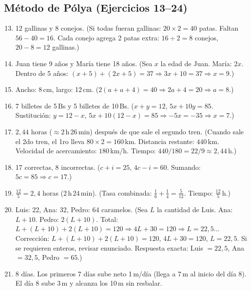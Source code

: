 \documentclass[12pt, letterpaper]{article}
\begin{document}
  \subsection*{Método de Pólya (Ejercicios 13--24)}

  \begin{enumerate}[leftmargin=*, label=\textbf{\arabic*.}]
    \setcounter{enumi}{12}
    \item 12 gallinas y 8 conejos. (Si todas fueran gallinas: $20 \times 2 = 40$ patas. Faltan $56 - 40 = 16$. Cada conejo agrega 2 patas extra: $16 \div 2 = 8$ conejos, $20 - 8 = 12$ gallinas.)

    \item Juan tiene 9 años y María tiene 18 años. (Sea $x$ la edad de Juan. María: $2x$. Dentro de 5 años: $(x + 5) + (2x + 5) = 37 \Rightarrow 3x + 10 = 37 \Rightarrow x = 9$.)

    \item Ancho: 8\,cm, largo: 12\,cm. ($2(a + a + 4) = 40 \Rightarrow 2a + 4 = 20 \Rightarrow a = 8$.)

    \item 7 billetes de 5\,Bs y 5 billetes de 10\,Bs. ($x + y = 12$, $5x + 10y = 85$. Sustitución: $y = 12 - x$, $5x + 10(12 - x) = 85 \Rightarrow -5x = -35 \Rightarrow x = 7$.)

    \item $2{,}44$ horas ($\approx 2$\,h\,26\,min) después de que sale el segundo tren. (Cuando sale el 2do tren, el 1ro lleva $80 \times 2 = 160$\,km. Distancia restante: $440$\,km. Velocidad de acercamiento: $180$\,km/h. Tiempo: $440/180 = 22/9 \approx 2{,}44$\,h.)

    \item 17 correctas, 8 incorrectas. ($c + i = 25$, $4c - i = 60$. Sumando: $5c = 85 \Rightarrow c = 17$.)

    \item $\frac{12}{5} = 2{,}4$ horas (2\,h\,24\,min). (Tasa combinada: $\frac{1}{6} + \frac{1}{4} = \frac{5}{12}$. Tiempo: $\frac{12}{5}$\,h.)

    \item Luis: 22, Ana: 32, Pedro: 64 caramelos. (Sea $L$ la cantidad de Luis. Ana: $L + 10$. Pedro: $2(L + 10)$. Total: $L + (L + 10) + 2(L + 10) = 120 \Rightarrow 4L + 30 = 120 \Rightarrow L = 22{,}5$... Corrección: $L + (L+10) + 2(L+10) = 120$, $4L + 30 = 120$, $L = 22{,}5$. Si se requieren enteros, revisar enunciado. Respuesta exacta: Luis $= 22{,}5$, Ana $= 32{,}5$, Pedro $= 65$.)

    \item 8 días. Los primeros 7 días sube neto 1\,m/día (llega a 7\,m al inicio del día 8). El día 8 sube 3\,m y alcanza los 10\,m sin resbalar.


\end{enumerate}
\end{document}
